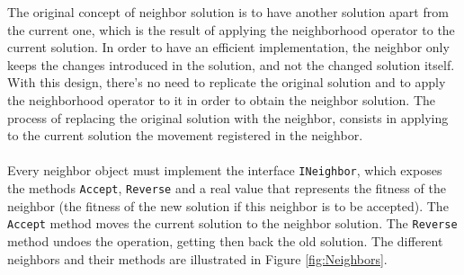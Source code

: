 The original concept of neighbor solution is to have another solution apart from the current one, which is the result of applying the neighborhood operator to the current solution. In order to have an efficient implementation, the neighbor only keeps the changes introduced in the solution, and not the changed solution itself. With this design, there's no need to replicate the original solution and to apply the neighborhood operator to it in order to obtain the neighbor solution. The process of replacing the original solution with the neighbor, consists in applying to the current solution the movement registered in the neighbor.\\
\\
Every neighbor object must implement the interface \verb+INeighbor+, which exposes the methods \verb+Accept+, \verb+Reverse+ and a real value that represents the fitness of the neighbor (the fitness of the new solution if this neighbor is to be accepted). The \verb+Accept+ method  moves the current solution to the neighbor solution. The \verb+Reverse+ method undoes the operation, getting then back the old solution. The different neighbors and their methods are illustrated in Figure \ref{fig:Neighbors}.\\
